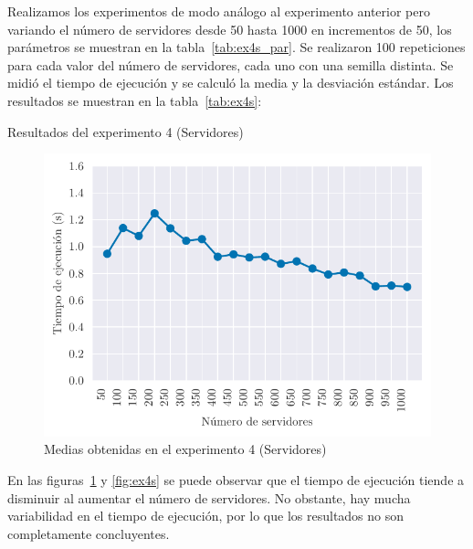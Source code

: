 Realizamos los experimentos de modo análogo al experimento anterior pero variando el número
de servidores desde 50 hasta 1000 en incrementos de 50, los parámetros se muestran en la
tabla~\ref{tab:ex4s_par}. Se realizaron 100 repeticiones para
cada valor del número de servidores, cada uno con una semilla distinta.
Se midió el tiempo de ejecución y se calculó la media
y la desviación estándar. Los resultados se muestran en la tabla~\ref{tab:ex4s}:

\begin{table}[H]
    \caption{Resultados del experimento 4 (Servidores)}%
    \label{tab:ex4s}
    \begin{center}
    
    \end{center}
\end{table}

\begin{figure}[H]
    \centering
    \includegraphics{include/plots/ex4_s_mean_time.pdf}
    \caption{Medias obtenidas en el experimento 4 (Servidores)}%
    \label{fig:ex4s_mean}
\end{figure}

En las figuras~\ref{fig:ex4s_mean} y \ref{fig:ex4s} se puede observar que el tiempo de ejecución tiende a disminuir
al aumentar el número de servidores. No obstante, hay mucha variabilidad en el tiempo de ejecución, por lo que 
los resultados no son completamente concluyentes.

